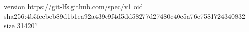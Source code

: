 version https://git-lfs.github.com/spec/v1
oid sha256:4b3fecbeb89d1b1ea92a439c9f4d5dd58277d27480c40c5a76e7581724340832
size 314207
